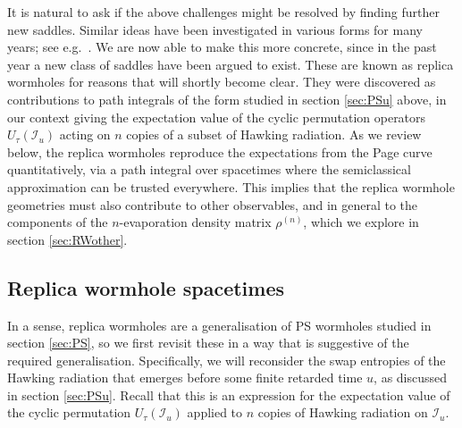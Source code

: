 \documentclass[letterpaper,12pt]{article}
\newcommand*{\scri}{\mathscr{I}} %
\begin{document}
It is natural to ask if the above challenges might be resolved by finding further new saddles. Similar ideas have been investigated in various forms for many years; see e.g.\ \cite{Hawking:1987mz,Giddings:1987cg,Hawking:1988ae,Maldacena:2001kr,Hawking:2005kf}. We are now able to make this more concrete, since in the past year a new class of saddles  have been argued to exist. These are known as replica wormholes for reasons that will shortly become clear. They were discovered as contributions to path integrals of the form studied in section \ref{sec:PSu} above, in our context giving the expectation value of the cyclic permutation operators $U_\tau(\scri_u)$ acting on $n$ copies of a subset of Hawking radiation. As we review below, the replica wormholes reproduce the expectations from the Page curve quantitatively, via a path integral over spacetimes where the semiclassical approximation can be trusted everywhere. This implies that the replica wormhole geometries must also contribute to other observables, and in general to the components of the $n$-evaporation density matrix $\rho^{(n)}$, which we explore in section \ref{sec:RWother}.

\subsection{Replica wormhole spacetimes}
\label{sec:repQES}

In a sense, replica wormholes are a generalisation of PS wormholes studied in section \ref{sec:PS}, so we first revisit these in a way that is suggestive of the required generalisation. Specifically, we will reconsider the swap entropies of the Hawking radiation that emerges before some finite retarded time $u$, as discussed in section \ref{sec:PSu}. Recall that this is an expression for the expectation value of the cyclic permutation $U_\tau(\scri_u)$ applied to $n$ copies of Hawking radiation on $\scri_u$.
\end{document}
